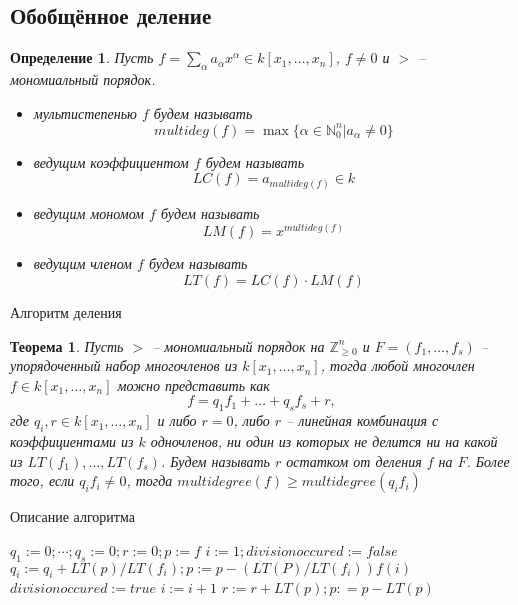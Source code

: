 \documentclass[notheorems,aspectratio=169]{beamer}
\newtheorem{theorem}{Теорема}
\newtheorem{definition}{Определение}
\begin{document}
\subsection{Обобщённое деление}
\begin{frame}
    \begin{definition}
     Пусть $f = \sum_\alpha a_\alpha x^\alpha\in k[x_1, \dots, x_n]$, $f \neq 0$ и $>$ -- мономиальный порядок.
    \begin{itemize}
        \item [(i)] мультистепенью $f$ будем называть 
            $$
                multideg(f) = \max\{\alpha\in\mathbb{N}_{0}^n| a_\alpha \neq 0\}
            $$
        \item [(ii)] ведущим коэффициентом $f$ будем называть 
            $$
                LC(f) = a_{multideg(f)} \in k
            $$
        \item [(iii)] ведущим мономом $f$ будем называть 
        $$
            LM(f) = x^{multideg(f)}
        $$
        \item [(iv)] ведущим членом $f$ будем называть 
        $$
            LT(f) = LC(f)\cdot LM(f)
        $$
    \end{itemize}
    \end{definition}
    
\end{frame}

\begin{frame}{Алгоритм деления}
    \begin{theorem}
    Пусть $>$ -- мономиальный порядок на $\mathbb{Z}_{\geq 0}^n$ и $F=(f_1, \dots, f_s)$ -- упорядоченный набор многочленов из $k[x_1,\dots, x_n]$, тогда любой многочлен $f\in k[x_1,\dots, x_n]$ можно представить как
    $$
        f = q_1f_1+\dots+q_sf_s+r,
    $$
    где $q_i, r \in k[x_1,\dots, x_n]$ и либо $r = 0$, либо $r$ -- линейная комбинация с коэффициентами из $k$ одночленов, ни один из которых не делится ни на какой из $LT(f_1),\dots, LT(f_s)$.
    Будем называть $r$ остатком от деления $f$ на $F$.  
    Более того, если $q_if_i\neq0$, тогда $multidegree(f)\geq multidegree(q_if_i)$
    \end{theorem}
    
\end{frame}

\begin{frame}{Описание алгоритма}
     \begin{algorithmic}
   \State $q_1 := 0;\cdots;q_s := 0; r := 0;p := f$
        \State $i := 1; divisionoccured := false$
                \State $q_i:=q_i + LT(p)/LT(f_i); p := p - \left(LT(P)/LT(f_i)\right)f(i)$
                \State $divisionoccured := true$
            \Else 
                \State $i := i + 1$
            \EndIf
        \EndWhile
        \State $r := r + LT(p); p : = p - LT(p)$
        \EndIf
   \EndWhile
    \end{algorithmic}
\end{frame}
\end{document}
